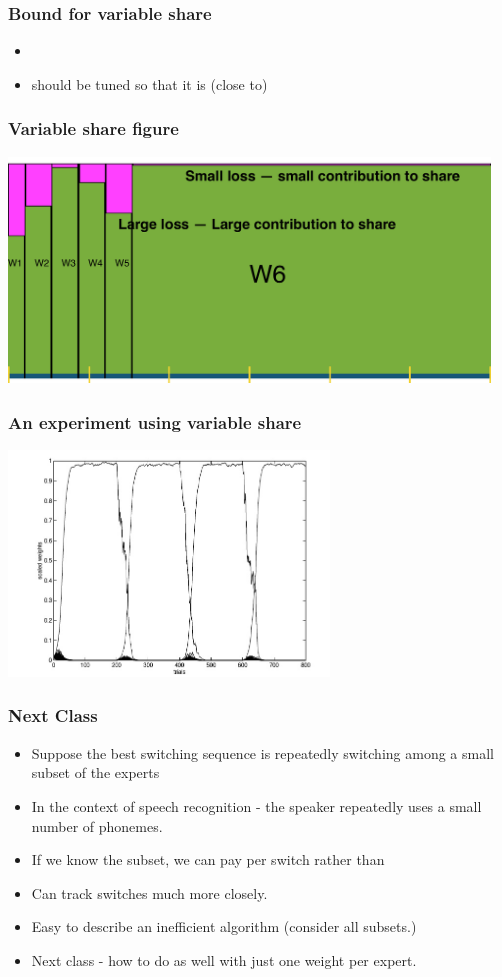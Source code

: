 \documentclass{beamer}
\begin{document}
\begin{frame}
\frametitle{Bound for variable share}
\begin{itemize}
\item
{}
\item \R{$\alpha$} should be tuned so that it is (close to) 
\end{itemize}
\end{frame}

\begin{frame}
\frametitle{Variable share figure}
\includegraphics[height=6cm]{figures/IntermediateWeights-Variable-Share-1.pdf}
\end{frame}

\begin{frame}
\frametitle{An experiment using variable share}
\includegraphics[height=6cm]{figures/VariableShareFigure.jpg}
\end{frame}

\begin{frame}
\frametitle{Next Class}
\begin{itemize}
\item Suppose the best switching sequence is repeatedly switching among a small subset of the experts
\item In the context of speech recognition - the speaker repeatedly uses a small number of phonemes.
\item If we know the subset, we can pay  per switch rather than 
\item Can track switches much more closely.
\item Easy to describe an inefficient algorithm (consider all  subsets.)
\item Next class - how to do as well with just one weight per expert.
\end{itemize}
\end{frame}

%
\end{document}
